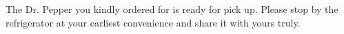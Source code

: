 \documentclass{article}
\begin{document}
The Dr. Pepper you kindly ordered for is ready for pick up. Please stop by the
refrigerator at your earliest convenience and share it with yours truly.
\end{document}
